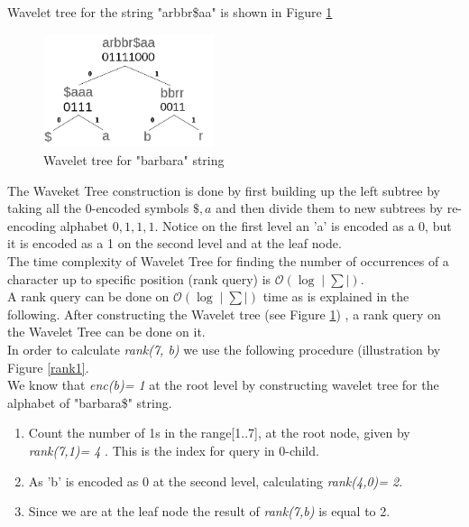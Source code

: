 \documentclass[11pt,a4paper]{report}
\begin{document}
Wavelet tree for the string "arbbr\$aa" is shown in Figure \ref{Wavlet-barbara}
\begin{figure}[H]
\centering
\includegraphics[width=5cm]{pictures/barbara-wavlet2.png}
\caption{Wavelet tree for "barbara" string }
\label{Wavlet-barbara}
\end{figure}

The Waveket Tree construction is done by first building 
up the left subtree by taking all the 0-encoded symbols 
${\$,a}$ and then divide them to new subtrees by re-encoding 
alphabet ${0,1,1,1}$. Notice on the first level an 'a' is 
encoded as a 0, but it is encoded as a 1 on the second 
level and at the leaf node.\\
The time complexity of Wavelet Tree for finding the number
of occurrences of a character up to specific position (rank 
query) is $\mathcal{O}(\log{}\mid\sum\mid)$.\\
A rank query can be done on $\mathcal{O}(\log{}\mid\sum\mid)$ time 
as is explained in the following.
After constructing the Wavelet tree (see Figure \ref{Wavlet-barbara})
, a rank query on the Wavelet Tree can be done on it. 
\\
In order to calculate \emph{rank(7, b)} we use the following 
procedure (illustration by Figure \ref{rank1}.\\
We know that \emph{enc(b)= 1} at the root level by 
constructing wavelet tree for the alphabet of "barbara\$"
string.

\begin{enumerate}

    \item
		 Count the number of 1s in the range[1..7], at the root node, 
		 given by \emph{rank(7,1)= 4 }. This is the index for query in 
		 0-child. 
		 
    \item
		As 'b' is encoded as 0 at the second level, calculating \emph
		{rank(4,0)= 2}. 

    \item
		Since we are at the leaf node the result of \emph{rank(7,b)} is
		equal to 2.
\end{enumerate}
\end{document}
